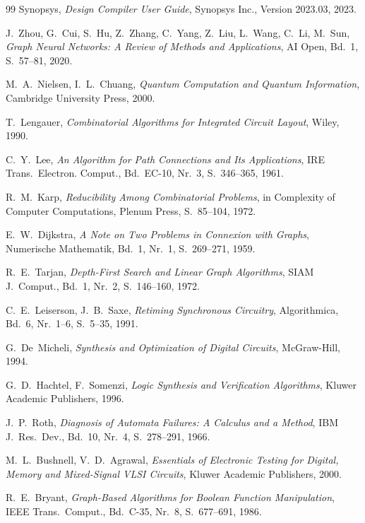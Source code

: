 ﻿\documentclass[a4paper,12pt]{article}
\theoremstyle{definition}
\begin{document}
\begin{thebibliography}{99}
Synopsys,
\emph{Design Compiler User Guide},
Synopsys Inc., Version 2023.03, 2023.

J.~Zhou, G.~Cui, S.~Hu, Z.~Zhang, C.~Yang, Z.~Liu, L.~Wang, C.~Li, M.~Sun,
\emph{Graph Neural Networks: A Review of Methods and Applications},
AI Open, Bd.~1, S.~57--81, 2020.

M.~A.~Nielsen, I.~L.~Chuang,
\emph{Quantum Computation and Quantum Information},
Cambridge University Press, 2000.

T.~Lengauer,
\emph{Combinatorial Algorithms for Integrated Circuit Layout},
Wiley, 1990.

C.~Y.~Lee,
\emph{An Algorithm for Path Connections and Its Applications},
IRE Trans.~Electron. Comput., Bd.~EC-10, Nr.~3, S.~346--365, 1961.

R.~M.~Karp,
\emph{Reducibility Among Combinatorial Problems},
in Complexity of Computer Computations, Plenum Press, S.~85--104, 1972.

E.~W.~Dijkstra,
\emph{A Note on Two Problems in Connexion with Graphs},
Numerische Mathematik, Bd.~1, Nr.~1, S.~269--271, 1959.

R.~E.~Tarjan,
\emph{Depth-First Search and Linear Graph Algorithms},
SIAM J.~Comput., Bd.~1, Nr.~2, S.~146--160, 1972.


C.~E.~Leiserson, J.~B.~Saxe,
\emph{Retiming Synchronous Circuitry},
Algorithmica, Bd.~6, Nr.~1--6, S.~5--35, 1991.

G.~De~Micheli,
\emph{Synthesis and Optimization of Digital Circuits},
McGraw-Hill, 1994.

G.~D.~Hachtel, F.~Somenzi,
\emph{Logic Synthesis and Verification Algorithms},
Kluwer Academic Publishers, 1996.

J.~P.~Roth,
\emph{Diagnosis of Automata Failures: A Calculus and a Method},
IBM J.~Res.~Dev., Bd.~10, Nr.~4, S.~278--291, 1966.

M.~L.~Bushnell, V.~D.~Agrawal,
\emph{Essentials of Electronic Testing for Digital, Memory and
Mixed-Signal VLSI Circuits},
Kluwer Academic Publishers, 2000.

R.~E.~Bryant,
\emph{Graph-Based Algorithms for Boolean Function Manipulation},
IEEE Trans.~Comput., Bd.~C-35, Nr.~8, S.~677--691, 1986.


\end{thebibliography}
\end{document}
